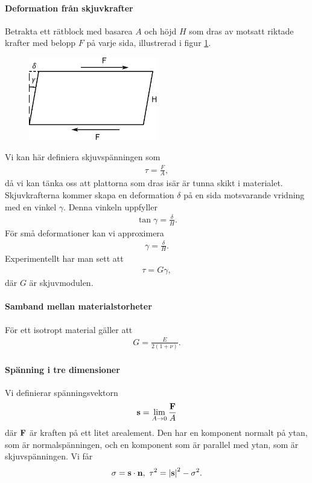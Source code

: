 \paragraph{Deformation från skjuvkrafter}
Betrakta ett rätblock med basarea $A$ och höjd $H$ som dras av motsatt riktade krafter med belopp $F$ på varje sida, illustrerad i figur \ref{fig:rectangle_twist}.
\begin{figure}[!ht]
	\centering
	\includegraphics[width = 0.5\textwidth]{./Images/rectangle_twist.eps}
	\label{fig:rectangle_twist}
\end{figure}

Vi kan här definiera skjuvspänningen som
\begin{align*}
	\tau = \frac{F}{A},
\end{align*}
då vi kan tänka oss att plattorna som dras isär är tunna skikt i materialet. Skjuvkrafterna kommer skapa en deformation $\delta$ på en sida motsvarande vridning med en vinkel $\gamma$. Denna vinkeln uppfyller
\begin{align*}
	\tan{\gamma} = \frac{\delta}{H}.
\end{align*}
För små deformationer kan vi approximera
\begin{align*}
	\gamma = \frac{\delta}{H}.
\end{align*}
Experimentellt har man sett att
\begin{align*}
	\tau = G\gamma,
\end{align*}
där $G$ är skjuvmodulen.

\paragraph{Samband mellan materialstorheter}
För ett isotropt material gäller att
\begin{align*}
	G = \frac{E}{2(1 + \nu)}.
\end{align*}

\paragraph{Spänning i tre dimensioner}
Vi definierar spänningsvektorn
\begin{align*}
	\vb{s} = \lim\limits_{A \to 0}\frac{\vb{F}}{A}
\end{align*}
där $\vb{F}$ är kraften på ett litet arealement. Den har en komponent normalt på ytan, som är normalspänningen, och en komponent som är parallel med ytan, som är skjuvspänningen. Vi får
\begin{align*}
	\sigma = \vb{s}\cdot\vb{n},\ \tau^{2} = \abs{\vb{s}}^{2} - \sigma^{2}.
\end{align*}

